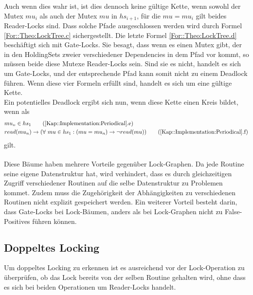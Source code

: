 Auch wenn dies wahr ist, ist dies dennoch keine gültige Kette, wenn sowohl der
Mutex $mu_i$ als auch der Mutex $mu$ in $hs_{i+1}$, für die $mu = mu_i$ gilt 
beides Reader-Locks sind. Dass solche Pfade ausgeschlossen werden wird durch 
Formel \ref{For::Theo:LockTree.c} sichergestellt. Die letzte Formel 
\ref{For::Theo:LockTree.d} beschäftigt sich mit Gate-Locks. 
Sie besagt, dass wenn es einen Mutex gibt, 
der in den HoldingSets zweier verschiedener Dependencies in dem Pfad vor kommt, 
so müssen beide diese Mutexe Reader-Locks sein. Sind sie es nicht, handelt es 
sich um Gate-Locks, und der entsprechende Pfad kann somit nicht zu einem 
Deadlock führen. Wenn diese vier Formeln erfüllt sind, handelt es sich um eine 
gültige Kette.\\
Ein potentielles Deadlock ergibt sich nun, wenn diese Kette einen Kreis 
bildet, wenn als 
\begin{align}
  &mu_n \in hs_{1} 
  \tag{\ref{Kap::Implementation:Periodical}.e}
  \label{For::Implementation:Periodical.e}\\
  &read(mu_n) \rightarrow 
  (\forall\ mu \in hs_{1}: (mu = mu_n) \to \lnot read(mu))
  \tag{\ref{Kap::Implementation:Periodical}.f}
  \label{For::Implementation:Periodical.f}
\end{align}
gilt.\\\\
Diese Bäume haben mehrere Vorteile gegenüber Lock-Graphen. Da jede Routine seine 
eigene Datenstruktur hat, wird verhindert, dass es durch 
gleichzeitigen Zugriff verschiedener Routinen auf die selbe Datenstruktur zu 
Problemen kommet. Zudem muss die Zugehörigkeit der Abhängigkeiten zu 
verschiedenen Routinen nicht explizit gespeichert werden. Ein weiterer Vorteil 
besteht darin, dass Gate-Locks bei Lock-Bäumen, anders als bei Lock-Graphen
nicht zu False-Positives führen können.


\subsection{Doppeltes Locking}
Um doppeltes Locking zu erkennen ist es ausreichend vor der Lock-Operation 
zu überprüfen, ob das Lock bereits von der selben Routine gehalten wird, ohne 
dass es sich bei beiden Operationen um Reader-Locks handelt.


